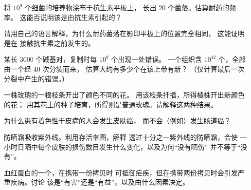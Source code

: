 \begin{exercise}[$\star\star$]\label{exo:g11:mutations:7}
将 $10^9$ 个细菌的培养物涂布于抗生素平板上，
长出 20 个菌落。估算耐药的频率。
这能否说明该是由抗生素引起的？
\end{exercise}

\begin{exercise}[$\star\star$]\label{exo:g11:mutations:8}
请用自己的语言解释，为什么耐药菌落在影印平板上的位置完全相同，
这能证明是在
接触抗生素之前发生的。
\end{exercise}

\begin{exercise}[$\star\star$]\label{exo:g11:mutations:9}
某长 \num{3000} 个碱基对，复制时每 $10^9$ 个出现一处错误。
一个组织含 $10^{12}$ 个，全部由一个经 40 次分裂而来，
估算大约有多少个在该上带有新？
（仅计算最后一次分裂中产生的错误。）
\end{exercise}

\begin{exercise}[$\star\star$]\label{exo:g11:mutations:10}
一株玫瑰的一根枝条开出了颜色不同的花。
用该枝条扦插，所得植株开出新颜色的花；
用其花上的种子培育，所得则是普通玫瑰。请解释这两种结果。
\end{exercise}

\begin{exercise}[$\star\star$]\label{exo:g11:mutations:11}
为什么患有着色性干皮病的人会发生皮肤癌，
而不会（例如）发生肠道癌？
\end{exercise}

\begin{exercise}[$\star\star\star$]\label{exo:g11:mutations:12}
防晒霜吸收紫外线。利用存活率图，解释
透过十分之一紫外线的防晒霜，会使
一小时日晒中每个皮肤的损伤数目发生什么变化，以及为何“没有晒伤”
并不等于“没有”。
\end{exercise}

\begin{exercise}[$\star\star\star$]\label{exo:g11:mutations:13}
血红蛋白的一个，在携带一份拷贝时
可抵御疟疾，但在携带两份拷贝时会引发严重疾病。讨论
该是“有害”还是“有益”，以及由什么因素决定。
\end{exercise}

